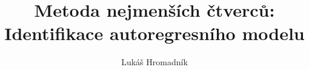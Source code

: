\title{Metoda nejmenších čtverců: Identifikace autoregresního modelu}
\author{Lukáš Hromadník}
\date{}

\maketitle


